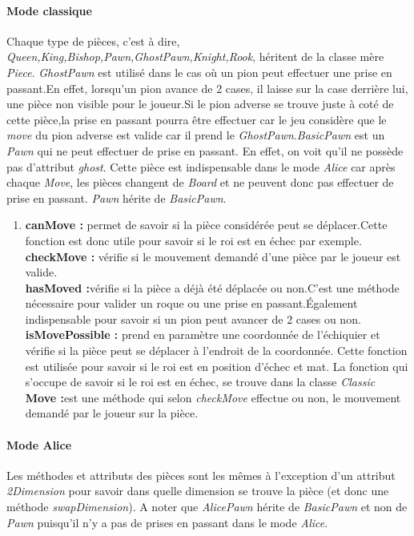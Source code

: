 \documentclass[10pt, a4paper]{article}
\begin{document}
\paragraph{Mode classique}Chaque type de pièces, c'est à dire, \textit{Queen,King,Bishop,Pawn,GhostPawn,Knight,Rook}, héritent de la classe mère \textit{Piece}.
\textit{GhostPawn} est utilisé dans le cas où un pion peut effectuer une prise en passant.En effet, lorsqu'un pion avance de 2 cases, il laisse sur la case derrière lui, une pièce non visible pour le joueur.Si le pion adverse se trouve juste à coté de cette pièce,la prise en passant pourra être effectuer car le jeu considère que le \textit{move} du pion adverse est valide car il prend le \textit{GhostPawn}.\textit{BasicPawn} est un \textit{Pawn} qui ne peut effectuer de prise en passant. En effet, on voit qu'il ne possède pas d'attribut \textit{ghost}. Cette pièce est indispensable dans le mode \textit{Alice} car après chaque \textit{Move}, les pièces changent de \textit{Board} et ne peuvent donc pas effectuer de prise en passant. \textit{Pawn} hérite de \textit{BasicPawn}.
\begin{enumerate}
\item
\textbf{canMove :} permet de savoir si la pièce considérée peut se déplacer.Cette fonction est donc utile pour savoir si le roi est en échec par exemple. \\
\textbf{checkMove :} vérifie si le mouvement demandé d'une pièce par le  joueur est valide.\\
\textbf{hasMoved :}vérifie si la pièce a déjà été déplacée ou non.C'est une méthode nécessaire pour valider un roque ou une prise en passant.Également indispensable pour savoir si un pion peut avancer de 2 cases ou non.\\
\textbf{isMovePossible :} prend en paramètre une coordonnée de l'échiquier et vérifie si la pièce peut se déplacer à l'endroit de la coordonnée. Cette fonction est utilisée pour savoir si le roi est en position d'échec et mat. La fonction qui s'occupe de savoir si le roi est en échec, se trouve dans la classe \textit{Classic} \\
\textbf{Move :}est une méthode qui selon \textit{checkMove} effectue ou  non, le mouvement demandé par le joueur sur la pièce.\\
\end{enumerate}

\paragraph{Mode Alice} Les méthodes et attributs des pièces sont les mêmes à l'exception d'un attribut \textit{2Dimension} pour savoir dans quelle dimension se trouve la pièce (et donc une méthode \textit{swapDimension}). A noter que \textit{AlicePawn} hérite de \textit{BasicPawn} et non de \textit{Pawn} puisqu'il n'y a pas de prises en passant dans le mode \textit{Alice}.
\end{document}
